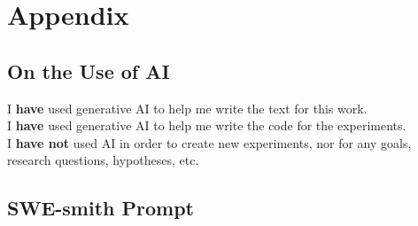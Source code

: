 \appendix
\chapter{Appendix}


\section{On the Use of AI}

I \textbf{have} used generative AI to help me write the text for this work.\\
I \textbf{have} used generative AI to help me write the code for the experiments.\\
I \textbf{have not} used AI in order to create new experiments, nor for any goals, research questions, hypotheses, etc.


\section{SWE-smith Prompt}
\label{app:swe-smith-prompt}

